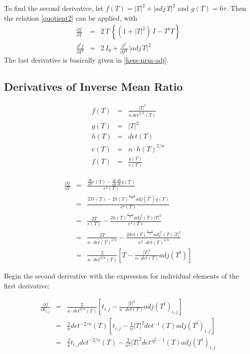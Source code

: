 \documentclass{report}
\begin{document}
\noindent To find the second derivative, let $f(T)=|T|^2 + |adj \, T|^2$ and
$g(T)=6 \tau$.  Then the relation \ref{quotient2} can be applied, with
\begin{eqnarray}
\frac{\partial f}{\partial T} & = & 2 \, T \, \left\{ \left( 1 + |T|^2 \right) \, I - T^t T \right\} \\
\frac{\partial^2 f}{\partial T^2} & = & 2 \, I_9 + \frac{\partial^2}{\partial T^2} \, |adj \, T|^2
\end{eqnarray}
The last derivative is basically given in \ref{hess-nrm-adj}. \newline

\subsection{Derivatives of Inverse Mean Ratio}

\begin{eqnarray}
f(T) & = & \frac{|T|^2}{n \, det^{2/n}(T)} \\
g(T) & = & |T|^2 \\
h(T) & = & det(T) \\
e(T) & = & n \cdot h(T)^{2/n} \\
f(T) & = & \frac{g(T)}{e(T)} 
\end{eqnarray}

\begin{eqnarray}
\frac{\partial f}{\partial T} &=& \frac{
\frac{\partial g}{\partial T} e(T) - 
\frac{\partial e}{\partial h} \frac{\partial h}{\partial t} g(T)}
{e^2(T)} \\
&=& 
\frac{2 T e(T) - 
2 h(T)^\frac{2-n}{n} adj(T^t) g(T)}
{e^2(T)} \\
& = &  
\frac{2 T}{e(T)} -
\frac{2 h(T)^{\frac{2-n}{n}} adj^t(T) |T|^2}{e^2(T)} \\
& = &  
\frac{2 T}{n \cdot det(T)^{2/n}} -
\frac{2 det(T)^{\frac{2-n}{n}} adj^t(T) |T|^2}{n^2 \cdot det(T)^{4/n}} \\
& = &  
\frac{2}{n \cdot det^{2/n}(T)}\left[ T - \frac{|T|^2}{n \cdot det(T)} adj(T^t) \right]
\end{eqnarray}

\noindent Begin the second derivative with the  expression for individual elements of the first derivative:

\begin{eqnarray}
\frac{\partial f}{\partial t_{i,j}} & = & 
\frac{2}{n \cdot det^{2/n}(T)}\left[ t_{i,j} - \frac{|T|^2}{n \cdot det(T)} adj(T^t)_{i,j} \right] \\
 & = & 
\frac{2}{n}det^{-2/n}(T)\left[ t_{i,j} - \frac{1}{n}|T|^2 det^{-1}(T) adj(T^t)_{i,j}\right] \\
 & = &
\frac{2}{n} t_{i,j} det^{-2/n}(T) - \frac{2}{n^2} |T|^2 det^{\frac{-2}{n} - 1}(T) adj(T^t)_{i,j} 
\end{eqnarray}
\end{document}

